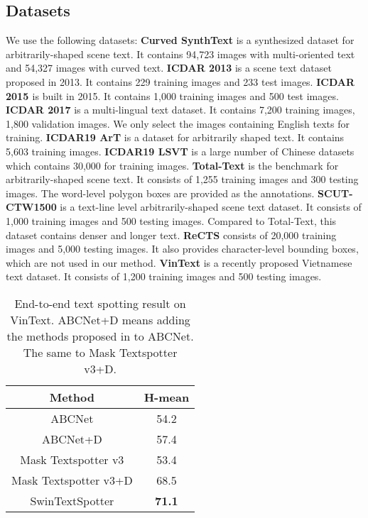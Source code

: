 \documentclass[10pt,twocolumn,letterpaper]{article}
\begin{document}
\subsection{Datasets}
We use the following datasets:
\textbf{Curved SynthText} \cite{liu2020abcnet}  is a synthesized dataset for arbitrarily-shaped scene text. It contains 94,723 images with multi-oriented text and 54,327 images with curved text.
\textbf{ICDAR 2013} \cite{karatzas2013icdar} is a scene text dataset proposed in 2013. It contains 229 training images and 233 test images.
\textbf{ICDAR 2015 \cite{karatzas2015icdar}} is built in 2015. It contains 1,000 training images and 500 test images.
\textbf{ICDAR 2017} \cite{nayef2017icdar2017} is a multi-lingual text dataset. It contains 7,200 training images, 1,800 validation images.
We only select the images containing English texts for training.
\textbf{ICDAR19 ArT}\cite{chng2019icdar2019} is a dataset for arbitrarily shaped text. It contains 5,603 training images.
\textbf{ICDAR19 LSVT}\cite{sun2019icdar} is a large number of Chinese datasets which contains 30,000 for training images.
\textbf{Total-Text} \cite{ch2020total} is the benchmark for arbitrarily-shaped scene text. It consists of 1,255 training images and 300 testing images.
The word-level polygon boxes are provided as the annotations.
\textbf{SCUT-CTW1500} \cite{liu2019curved} is a text-line level arbitrarily-shaped scene text dataset. It consists of 1,000 training images and 500 testing images. Compared to Total-Text, this dataset contains denser and longer text. 
\textbf{ReCTS} \cite{zhang2019icdar} consists of 20,000 training images and 5,000 testing images. It also provides character-level bounding boxes, which are not used in our method.
\textbf{VinText} \cite{m_Nguyen-etal-CVPR21} is a recently proposed Vietnamese text dataset. It consists of 1,200 training images and 500 testing images.

\begin{table}[t]
\centering
\begin{tabular}{c|c}
\hline
Method & H-mean                       \\ \hline 
ABCNet\cite{liu2020abcnet}                  & 54.2                     \\ \hline
ABCNet+D\cite{m_Nguyen-etal-CVPR21}     & 57.4                     \\ \hline
Mask Textspotter v3\cite{m_Nguyen-etal-CVPR21}     & 53.4                     \\ \hline
Mask Textspotter v3+D\cite{m_Nguyen-etal-CVPR21}     & 68.5                     \\ \hline
SwinTextSpotter                    & \textbf{71.1}                        \\ \hline
\end{tabular}
\caption{End-to-end text spotting result on VinText. ABCNet+D means adding the methods proposed in \cite{m_Nguyen-etal-CVPR21} to ABCNet. The same to Mask Textspotter v3+D.}
\label{VinText}
\end{table}
\end{document}
